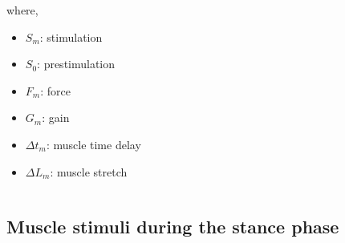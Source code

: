 \documentclass[10pt]{beamer}
\begin{document}
\begin{frame}
\begin{columns}
\begin{column}{.5\textwidth}
\begin{block}{}
				where,
				\begin{itemize}
					\item $S_{m}$: stimulation
					\item $S_{0}$: prestimulation
					\item $F_{m}$: force
					\item $G_{m}$: gain
					\item $\Delta t_{m}$: muscle time delay
					\item $\Delta L_m$: muscle stretch
				\end{itemize}
			\end{block}
		\end{column}
	\end{columns}
\end{frame}

\subsection[Methodology]{Muscle stimuli during the stance phase}
\end{document}
